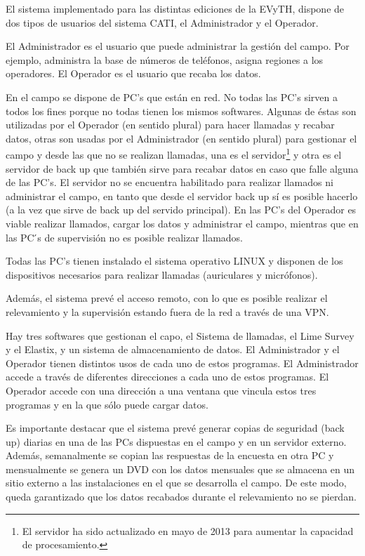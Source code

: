 \documentclass[
  openany]{book}
\begin{document}
El sistema implementado para las distintas ediciones de la EVyTH, dispone de dos tipos de usuarios del sistema CATI, el Administrador y el Operador.

El Administrador es el usuario que puede administrar la gestión del campo. Por ejemplo, administra la base de números de teléfonos, asigna regiones a los operadores. El Operador es el usuario que recaba los datos.

En el campo se dispone de PC's que están en red. No todas las PC's sirven a todos los fines porque no todas tienen los mismos softwares. Algunas de éstas son utilizadas por el Operador (en sentido plural) para hacer llamadas y recabar datos, otras son usadas por el Administrador (en sentido plural) para gestionar el campo y desde las que no se realizan llamadas, una es el servidor\footnote{El servidor ha sido actualizado en mayo de 2013 para aumentar la capacidad de procesamiento.} y otra es el servidor de back up que también sirve para recabar datos en caso que falle alguna de las PC's. El servidor no se encuentra habilitado para realizar llamados ni administrar el campo, en tanto que desde el servidor back up sí es posible hacerlo (a la vez que sirve de back up del servido principal). En las PC's del Operador es viable realizar llamados, cargar los datos y administrar el campo, mientras que en las PC ́s de supervisión no es posible realizar llamados.

Todas las PC's tienen instalado el sistema operativo LINUX y disponen de los dispositivos necesarios para realizar llamadas (auriculares y micrófonos).

Además, el sistema prevé el acceso remoto, con lo que es posible realizar el relevamiento y la supervisión estando fuera de la red a través de una VPN.

Hay tres softwares que gestionan el capo, el Sistema de llamadas, el Lime Survey y el Elastix, y un sistema de almacenamiento de datos. El Administrador y el Operador tienen distintos usos de cada uno de estos programas. El Administrador accede a través de diferentes direcciones a cada uno de estos programas. El Operador accede con una dirección a una ventana que vincula estos tres programas y en la que sólo puede cargar datos.

Es importante destacar que el sistema prevé generar copias de seguridad (back up) diarias en una de las PCs dispuestas en el campo y en un servidor externo. Además, semanalmente se copian las respuestas de la encuesta en otra PC y mensualmente se genera un DVD con los datos mensuales que se almacena en un sitio externo a las instalaciones en el que se desarrolla el campo. De este modo, queda garantizado que los datos recabados durante el relevamiento no se pierdan.
\end{document}
